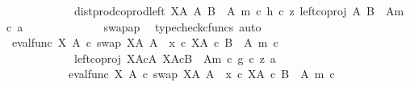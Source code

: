 \begin{isabellebody}
\ \ \ \ \ \ \ \ \ \ \ \ dist{\isacharunderscore}{\kern0pt}prod{\isacharunderscore}{\kern0pt}coprod{\isacharunderscore}{\kern0pt}left\ {\isacharparenleft}{\kern0pt}X\isactrlbsup A\isactrlesup {\isacharparenright}{\kern0pt}\ A\ {\isacharparenleft}{\kern0pt}B\ {\isasymsetminus}\ {\isacharparenleft}{\kern0pt}A{\isacharcomma}{\kern0pt}\ m{\isacharparenright}{\kern0pt}{\isacharparenright}{\kern0pt}\ {\isasymcirc}\isactrlsub c\ {\isasymlangle}h\ {\isasymcirc}\isactrlsub c\ z{\isacharcomma}{\kern0pt}\ left{\isacharunderscore}{\kern0pt}coproj\ A\ {\isacharparenleft}{\kern0pt}B\ {\isasymsetminus}\ {\isacharparenleft}{\kern0pt}A{\isacharcomma}{\kern0pt}m{\isacharparenright}{\kern0pt}{\isacharparenright}{\kern0pt}\ {\isasymcirc}\isactrlsub c\ a{\isasymrangle}{\isachardoublequoteclose}\isanewline
\ \ \ \ \ \ \ \ \ \ \ \ \isamarkupfalse%
\ swap{\isacharunderscore}{\kern0pt}ap\ \isamarkupfalse%
\ {\isacharparenleft}{\kern0pt}typecheck{\isacharunderscore}{\kern0pt}cfuncs{\isacharcomma}{\kern0pt}\ auto{\isacharparenright}{\kern0pt}\isanewline
\ \ \ \ \ \ \ \ \ \ \isamarkupfalse%
\ \isamarkupfalse%
\ {\isachardoublequoteopen}{\isacharparenleft}{\kern0pt}eval{\isacharunderscore}{\kern0pt}func\ X\ A\ {\isasymcirc}\isactrlsub c\ swap\ {\isacharparenleft}{\kern0pt}X\isactrlbsup A\isactrlesup {\isacharparenright}{\kern0pt}\ A{\isacharparenright}{\kern0pt}\ {\isasymamalg}\ {\isacharparenleft}{\kern0pt}x\ {\isasymcirc}\isactrlsub c\ {\isasymbeta}\isactrlbsub X\isactrlbsup A\isactrlesup \ {\isasymtimes}\isactrlsub c\ {\isacharparenleft}{\kern0pt}B\ {\isasymsetminus}\ {\isacharparenleft}{\kern0pt}A{\isacharcomma}{\kern0pt}\ m{\isacharparenright}{\kern0pt}{\isacharparenright}{\kern0pt}\isactrlesub {\isacharparenright}{\kern0pt}\ {\isasymcirc}\isactrlsub c\isanewline
\ \ \ \ \ \ \ \ \ \ \ \ left{\isacharunderscore}{\kern0pt}coproj\ {\isacharparenleft}{\kern0pt}X\isactrlbsup A\isactrlesup {\isasymtimes}\isactrlsub cA{\isacharparenright}{\kern0pt}\ {\isacharparenleft}{\kern0pt}X\isactrlbsup A\isactrlesup {\isasymtimes}\isactrlsub c{\isacharparenleft}{\kern0pt}B\ {\isasymsetminus}\ {\isacharparenleft}{\kern0pt}A{\isacharcomma}{\kern0pt}m{\isacharparenright}{\kern0pt}{\isacharparenright}{\kern0pt}{\isacharparenright}{\kern0pt}\ {\isasymcirc}\isactrlsub c\ {\isasymlangle}g\ {\isasymcirc}\isactrlsub c\ z{\isacharcomma}{\kern0pt}\ a{\isasymrangle}\isanewline
\ \ \ \ \ \ \ \ \ \ {\isacharequal}{\kern0pt}\ {\isacharparenleft}{\kern0pt}eval{\isacharunderscore}{\kern0pt}func\ X\ A\ {\isasymcirc}\isactrlsub c\ swap\ {\isacharparenleft}{\kern0pt}X\isactrlbsup A\isactrlesup {\isacharparenright}{\kern0pt}\ A{\isacharparenright}{\kern0pt}\ {\isasymamalg}\ {\isacharparenleft}{\kern0pt}x\ {\isasymcirc}\isactrlsub c\ {\isasymbeta}\isactrlbsub X\isactrlbsup A\isactrlesup \ {\isasymtimes}\isactrlsub c\ {\isacharparenleft}{\kern0pt}B\ {\isasymsetminus}\ {\isacharparenleft}{\kern0pt}A{\isacharcomma}{\kern0pt}\ m{\isacharparenright}{\kern0pt}{\isacharparenright}{\kern0pt}\isactrlesub {\isacharparenright}{\kern0pt}\ {\isasymcirc}\isactrlsub c\isanewline

\end{isabellebody}
